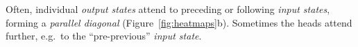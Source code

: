 \documentclass[11pt,a4paper]{article}
\newcommand\eg{e.g.\ }
\newcommand{\word}{\emph{input state}\xspace}
\newcommand{\words}{\emph{input states}\xspace}
\newcommand{\state}{\emph{output state}\xspace}
\newcommand{\states}{\emph{output states}\xspace}
\def\RR#1{{\color{blue}RR: \it #1}}
\def\DM#1{{\color{red}DM: \it #1}}
\def\JL#1{{\color{magenta}JL: \it #1}}
\def\JLrepl#1#2{{\color{magenta}JL: \sout{#1} \it #2}}
\def\JL#1{}
\def\JLrepl#1#2{}
\def\RR#1{}
\def\DM#1{}
\begin{document}
Often,
individual \states attend to preceding or following \words, forming a \emph{parallel diagonal} (Figure~\ref{fig:heatmaps}b).
Sometimes the heads attend further, \eg to the ``pre-previous'' \word.

\end{document}
